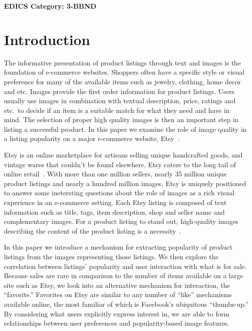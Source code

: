 \documentclass[conference,a4paper]{IEEEtran}
\newcommand{\etc}{etc.~}
\begin{document}




\ifCLASSOPTIONpeerreview
 \begin{center} \bfseries EDICS Category: 3-BBND \end{center}
 \fi
%
\IEEEpeerreviewmaketitle



\section{Introduction}
The informative presentation of product listings through text and 
images is the foundation of e-commerce websites. Shoppers often have a 
specific style or visual preference for many of the available items such as jewelry, clothing, home decor and etc. 
Images provide the first order information for product listings. 
Users usually use images in combination with textual description, price, ratings and \etc to decide if an item is a suitable match for what they need and have in mind. The selection of proper high quality images is then an important step in listing a successful product. In this paper we examine the role of image quality in a listing popularity on a major e-commerce website, Etsy~.



Etsy is an online marketplace for artisans selling unique handcrafted goods, and vintage wares that
couldn't be found elsewhere. Etsy caters to the long tail of online retail~\cite{Anderson:2006,aryafar2014exploring}. With more than one million sellers, nearly $35$ million unique product listings and nearly a hundred million images, Etsy is uniquely positioned to answer some inetersting questions about the role of images as a rich visual experience in an e-commerce setting. Each Etsy listing is composed of text information such as title, tags, item description, shop and seller name and complementary images. For a product listing to stand out, high-quality images describing the content of the product listing is a necessity~\cite{wang2011aesthetics,obrador2009role}. 



In this paper we introduce a mechanism for extracting popularity of product listings from the images representing those listings. We then explore the correlation between listings' popularity and user interaction with what is for sale. Because sales are rare in comparison to the number of items available on a large site such as Etsy, we look into an alternative mechanism for interaction, the ``favorite.'' Favorites on Etsy are similar to any number of ``like'' mechanisms available online, the most familiar of which is Facebook's ubiquitous ``thumbs-up.'' By considering what users explicitly express interest in, we are able to form relationships between user preferences and popularity-based image features. 
 
\end{document}
